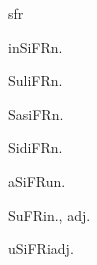 \begin{multicols*}{2}
\begin{dictroot}{s}{fr}
\begin{dictentry}{inSiFR}{n.}
{        }
    \end{dictentry}
    \begin{dictentry}{SuliFR}{n.}
    \end{dictentry}
    \begin{dictentry}{SasiFR}{n.}
    \end{dictentry}
    \begin{dictentry}{SidiFR}{n.}
    \end{dictentry}
    \begin{dictentry}{aSiFRu}{n.}
    \end{dictentry}
    \begin{dictentry}{SuFRi}{n., adj.}
    \end{dictentry}
    \begin{dictentry}{uSiFRi}{adj.}
    \end{dictentry}
\end{dictroot}


\end{multicols*}
